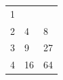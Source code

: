 {{\begin{center}
\begin{tabular}[t]{|l|l|l|}
        1%
     \tabularnewline\cline{1-1}\cline{2-2}\cline{3-3}
        2 &
        4 &
        8%
     \tabularnewline\cline{1-1}\cline{2-2}\cline{3-3}
        3 &
        9 &
        27%
     \tabularnewline\cline{1-1}\cline{2-2}\cline{3-3}
        4 &
        16 &
        64%
     \tabularnewline\cline{1-1}\cline{2-2}\cline{3-3}

\end{tabular}
\end{center}}}
